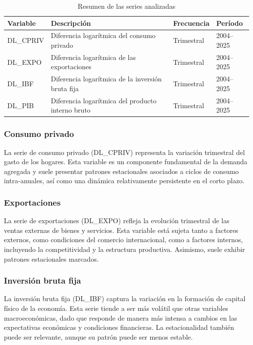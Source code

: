 \documentclass[11pt]{article}
\begin{document}
\begin{table}[H]
\centering
\caption{Resumen de las series analizadas}
\begin{tabular}{llll}
\hline
Variable & Descripción & Frecuencia & Período \\
\hline
DL\_CPRIV & Diferencia logarítmica del consumo privado & Trimestral & 2004--2025 \\
DL\_EXPO  & Diferencia logarítmica de las exportaciones & Trimestral & 2004--2025 \\
DL\_IBF   & Diferencia logarítmica de la inversión bruta fija & Trimestral & 2004--2025 \\
DL\_PIB   & Diferencia logarítmica del producto interno bruto & Trimestral & 2004--2025 \\
\hline
\end{tabular}
\label{tab:series_resumen}
\end{table}

\subsubsection{Consumo privado}

La serie de consumo privado (DL\_CPRIV) representa la variación trimestral del gasto de los hogares. Esta variable es un componente fundamental de la demanda agregada y suele presentar patrones estacionales asociados a ciclos de consumo intra-anuales, así como una dinámica relativamente persistente en el corto plazo.

\subsubsection{Exportaciones}

La serie de exportaciones (DL\_EXPO) refleja la evolución trimestral de las ventas externas de bienes y servicios. Esta variable está sujeta tanto a factores externos, como condiciones del comercio internacional, como a factores internos, incluyendo la competitividad y la estructura productiva. Asimismo, suele exhibir patrones estacionales marcados.

\subsubsection{Inversión bruta fija}

La inversión bruta fija (DL\_IBF) captura la variación en la formación de capital físico de la economía. Esta serie tiende a ser más volátil que otras variables macroeconómicas, dado que responde de manera más intensa a cambios en las expectativas económicas y condiciones financieras. La estacionalidad también puede ser relevante, aunque su patrón puede ser menos estable.
\end{document}
